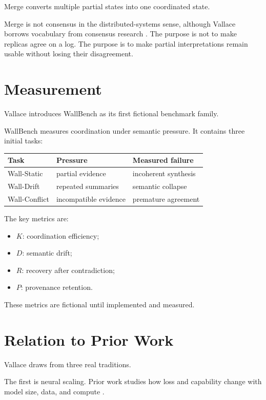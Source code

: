 \documentclass[11pt]{article}
\begin{document}
Merge converts multiple partial states into one coordinated state.

Merge is not consensus in the distributed-systems sense, although Vallace
borrows vocabulary from consensus research \cite{lamport1998part,ongaro2014search}.
The purpose is not to make replicas agree on a log. The purpose is to make
partial interpretations remain usable without losing their disagreement.

\section{Measurement}

Vallace introduces WallBench as its first fictional benchmark family.

WallBench measures coordination under semantic pressure. It contains three
initial tasks:

\begin{table}[h]
\centering
\begin{tabular}{lll}
\toprule
Task & Pressure & Measured failure \\
\midrule
Wall-Static & partial evidence & incoherent synthesis \\
Wall-Drift & repeated summaries & semantic collapse \\
Wall-Conflict & incompatible evidence & premature agreement \\
\bottomrule
\end{tabular}
\end{table}

The key metrics are:

\begin{itemize}
  \item $K$: coordination efficiency;
  \item $D$: semantic drift;
  \item $R$: recovery after contradiction;
  \item $P$: provenance retention.
\end{itemize}

These metrics are fictional until implemented and measured.

\section{Relation to Prior Work}

Vallace draws from three real traditions.

The first is neural scaling. Prior work studies how loss and capability change
with model size, data, and compute \cite{kaplan2020scaling,hoffmann2022training}.
\end{document}
